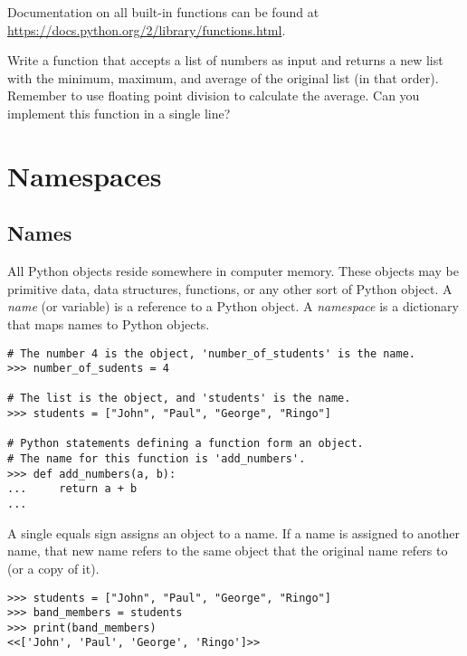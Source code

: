 Documentation on all built-in functions can be found at \url{https://docs.python.org/2/library/functions.html}.

\begin{problem}
Write a function that accepts a list of numbers as input and returns a new list with the minimum, maximum, and average of the original list (in that order).
Remember to use floating point division to calculate the average.
Can you implement this function in a single line?
\end{problem}

\section*{Namespaces}

\subsection*{Names}
All Python objects reside somewhere in computer memory.
These objects may be primitive data, data structures, functions, or any other sort of Python object.
A \emph{name} (or variable) is a reference to a Python object.
A \emph{namespace} is a dictionary that maps names to Python objects.

\begin{lstlisting}
# The number 4 is the object, 'number_of_students' is the name.
>>> number_of_sudents = 4

# The list is the object, and 'students' is the name.
>>> students = ["John", "Paul", "George", "Ringo"]

# Python statements defining a function form an object.
# The name for this function is 'add_numbers'.
>>> def add_numbers(a, b):
...     return a + b
... 
\end{lstlisting}

A single equals sign assigns an object to a name.
If a name is assigned to another name, that new name refers to the same object that the original name refers to (or a copy of it).

\begin{lstlisting}
>>> students = ["John", "Paul", "George", "Ringo"]
>>> band_members = students
>>> print(band_members)
<<['John', 'Paul', 'George', 'Ringo']>>
\end{lstlisting}

